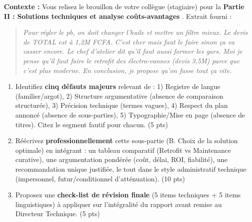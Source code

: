 \documentclass[11pt]{article}
\begin{document}
\begin{exercice}
\textbf{Contexte :} Vous relisez le brouillon de votre collègue (stagiaire) pour la \textbf{Partie II : \og Solutions techniques et analyse coûts-avantages \fg{}}. Extrait fourni :

\begin{quote}
\og \textit{Pour régler le pb, on doit changer l'huile et mettre un filtre mieux. Le devis de TOTAL est à 1,2M FCFA. C'est cher mais faut le faire sinon ça va casser encore. Le chef d'atelier dit qu'il faut aussi former les gars. Moi je pense qu'il faut faire le retrofit des électro-vannes (devis 3,5M) parce que c'est plus moderne. En conclusion, je propose qu'on fasse tout ça vite.} \fg{} 
\end{quote}

\begin{enumerate}
    \item Identifiez \textbf{cinq défauts majeurs} relevant de : 1) Registre de langue (familier/argot), 2) Structure argumentative (absence de comparaison structurée), 3) Précision technique (termes vagues), 4) Respect du plan annoncé (absence de sous-parties), 5) Typographie/Mise en page (absence de titres). Citez le segment fautif pour chacun. (5 pts)
    \item Réécrivez \textbf{professionnellement} cette sous-partie (B. Choix de la solution optimale) en intégrant : un tableau comparatif (Retrofit vs Maintenance curative), une argumentation pondérée (coût, délai, ROI, fiabilité), une recommandation unique justifiée, le tout dans le style administratif technique (impersonnel, futur/conditionnel d'atténuation). (10 pts)
    \item Proposez une \textbf{check-list de révision finale} (5 items techniques + 5 items linguistiques) à appliquer sur l'intégralité du rapport avant remise au Directeur Technique. (5 pts)
\end{enumerate}
\end{exercice}
\end{document}
